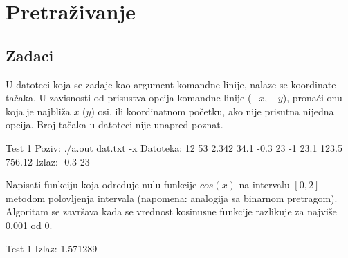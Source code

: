 
\chapter{Pretraživanje}

\section{Zadaci}

\begin{Exercise}[label=401]
  U datoteci koja se zadaje kao argument komandne linije, nalaze se
  koordinate tačaka. U zavisnosti od prisustva opcija komandne
  linije ($-x$, $-y$), pronaći onu koja je najbliža $x$ ($y$)
  osi, ili koordinatnom početku, ako nije prisutna nijedna
  opcija. Broj tačaka u datoteci nije unapred poznat.
  
\begin{miditest}
\begin{test}{Test 1}
Poziv: ./a.out dat.txt -x
Datoteka:
12 53
2.342 34.1
-0.3 23
-1 23.1
123.5 756.12
Izlaz: -0.3 23
\end{test}
\end{miditest}
  
\end{Exercise}

\begin{Answer}[ref=401]
\end{Answer}
\begin{Exercise}[label=402]
  Napisati funkciju koja određuje nulu funkcije $cos(x)$ na intervalu
  $[0,2]$ metodom polovljenja intervala (napomena: analogija sa binarnom
  pretragom). Algoritam se završava kada se vrednost kosinusne
  funkcije razlikuje za najviše 0.001 od 0.
  
\begin{minitest}
\begin{test}{Test 1}
Izlaz:
1.571289
\end{test}
\end{minitest}
  
\end{Exercise}

